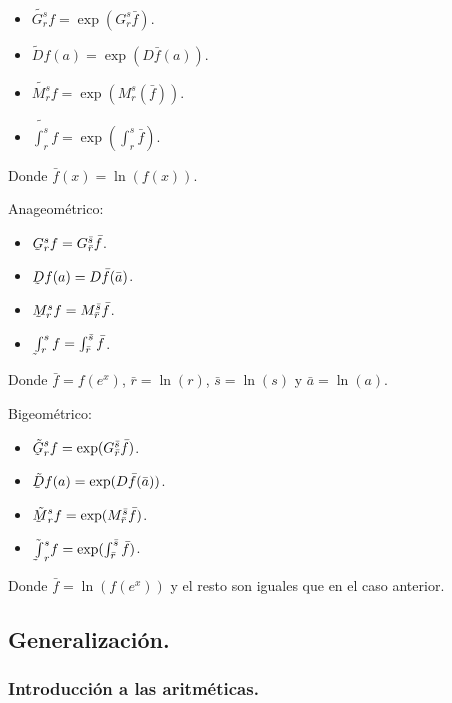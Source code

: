 \begin{itemize}
	\item $\tilde{G_r^s}f = \exp(G_r^s \bar{f})$.
	\item $\tilde{D}f(a) = \exp(D\bar{f}(a))$.
	\item $\tilde{M_r^s}f = \exp(M_r^s(\bar{f}))$.
	\item $\tilde{\int_r^s} f = \exp(\int_r^s \bar{f})$.
\end{itemize}

Donde $\bar{f}(x) = \ln(f(x))$.

Anageométrico:

\begin{itemize}
	\item $\underaccent{\tilde}{G}_r^s f = G_{\bar{r}}^{\bar{s}} \bar{f}$.
	\item $\underaccent{\tilde}{D}f(a) = D\bar{f}(\bar{a})$.
	\item $\underaccent{\tilde}{M}_r^sf = M_{\bar{r}}^{\bar{s}} \bar{f}$.
	\item $\underaccent{\tilde}{\int}_r^s f = \int_{\bar{r}}^{\bar{s}} \bar{f}$.
\end{itemize}

Donde $\bar{f} = f(e^x)$, $\bar{r} = \ln(r)$, $\bar{s} = \ln(s)$ y $\bar{a} = \ln(a)$.

Bigeométrico:

\begin{itemize}
	\item $\tilde{\underaccent{\tilde}{G}}_r^s f = \exp(G_{\bar{r}}^{\bar{s}} \bar{f})$.
	\item $\tilde{\underaccent{\tilde}{D}}f(a) = \exp(D\bar{f}(\bar{a}))$.
	\item $\tilde{\underaccent{\tilde}{M}}_r^s f = \exp(M_{\bar{r}}^{\bar{s}} \bar{f})$.
	\item $\tilde{\underaccent{\tilde}{\int}}_r^s f = \exp(\int_{\bar{r}}^{\bar{s}} \bar{f})$.
\end{itemize}

Donde $\bar{f} = \ln(f(e^x))$ y el resto son iguales que en el caso anterior.

\subsection{Generalización.} \label{general}

\subsubsection{Introducción a las aritméticas.}

